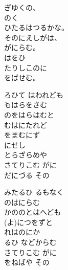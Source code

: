 \documentclass[10pt,b5j]{tarticle} %
\begin{document}
\vspace{1.5em} %
\newcommand{\linespace}{0.5em} %
\newcommand{\blocksize}{0.5\hsize} %
\begin{enumerate} %
    \begin{minipage}[c]{\blocksize}
    
        \vspace{\linespace}
        \item
        ぎゆくの、\\
        のく\\
        ひたるはつるかな。\\
        そのにえしがは、\\
        がにらむ。\\
        はをひ\\
        たりしこのに\\
        をばせむ。
        
        \vspace{\linespace}
        \item
        ろひて はわれども\\
        もはらをさむ\\
        のをはらはむと\\
        むはにたれど\\
        をまむにず\\
        にせし\\
        とらざらめや\\
        さてりこむ がに\\
        だにづる その
        
        \vspace{\linespace}
        \item
        みたるひ るもなく\\
        のはにらむ\\
        かののとはへども\\
        (よ)につをずと\\
        れはのにか\\
        るひ などからむ\\
        さてりこむ がに\\
        をねばや その
        

\end{minipage}
\end{enumerate}
\end{document}
